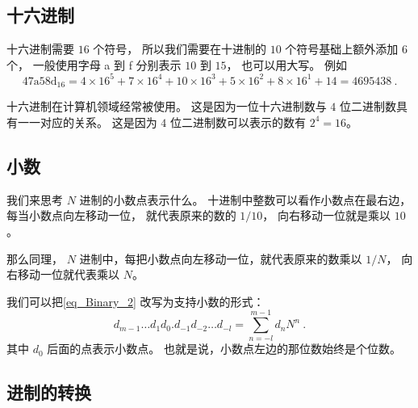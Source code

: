 
\subsection{十六进制}
十六进制需要 $16$ 个符号， 所以我们需要在十进制的 $10$ 个符号基础上额外添加 $6$ 个， 一般使用字母 a 到 f 分别表示 $10$ 到 $15$， 也可以用大写。 例如
\begin{equation}
\mathrm{47a58d}_\text{16} = 4\times 16^5 + 7\times 16^4 + 10\times 16^3 + 5\times 16^2 + 8 \times 16^1 + 14 = 4695438~.
\end{equation}

十六进制在计算机领域经常被使用。 这是因为一位十六进制数与 $4$ 位二进制数具有一一对应的关系。 这是因为 $4$ 位二进制数可以表示的数有 $2^4 = 16$。

\subsection{小数}
我们来思考 $N$ 进制的小数点表示什么。 十进制中整数可以看作小数点在最右边， 每当小数点向左移动一位， 就代表原来的数的 $1/10$， 向右移动一位就是乘以 $10$。

那么同理， $N$ 进制中，每把小数点向左移动一位，就代表原来的数乘以 $1/N$， 向右移动一位就代表乘以 $N$。

我们可以把\autoref{eq_Binary_2} 改写为支持小数的形式：
\begin{equation}
d_{m-1}\dots d_1d_0.d_{-1}d_{-2}\dots d_{-l} = \sum_{n=-l}^{m-1} d_n N^n~.
\end{equation}
其中 $d_0$ 后面的点表示小数点。 也就是说，小数点左边的那位数始终是个位数。


\subsection{进制的转换}
